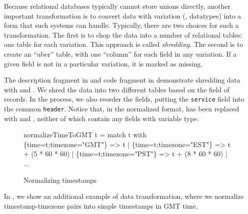 Because relational databases typically cannot store unions directly,
another important transformation is to convert data with variation
(\ie{}, datatypes) into a form that such systems can handle.
Typically, there are two choices for such a transformation.  The first
is to chop the data into a number of relational tables: one table for
each variation.  This approach is called \textit{shredding}. The
second is to create an ``uber'' table, with one ``column'' for each
field in any variation.  If a given field is not in a particular
variation, it is marked as missing. 

The description fragment in  and code
fragment in  demonstrate shredding
\darkstar{} data with \padsml{} and \ocaml{}. We shred the data into
two different tables based on the  field of 
records. In the process, we also reorder the fields, putting the
\texttt{service} field into the common \texttt{header}. Notice that, in
the normalized format,  has been replaced with 
and , neither of which contain any fields with variable
type.

\begin{figure}
  \centering
  \begin{code}\scriptsize
{} normalizeTimeToGMT t = 
    match t with
      \{time=t;timezone="GMT"\} => t
    | \{time=t;timezone="EST"\} => t + (5 * 60 * 60)
    | \{time=t;timezone="PST"\} => t + (8 * 60 * 60)
    | ... \end{code}
  \caption{Normalizing timestamps}
  \label{fig:ex-normalize}
\end{figure}

In , we show an additional example of data
transformation, where we normalize timestamp-timezone pairs into
simple timestamps in GMT time.

